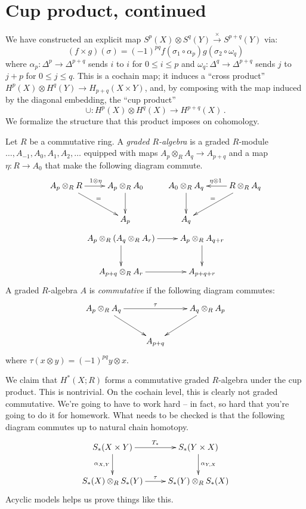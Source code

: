 \section{Cup product, continued}
We have constructed an explicit map $S^p(X)\otimes S^q(Y)\xrightarrow{\times} S^{p+q}(Y)$ via:
\begin{equation*}
(f\times g)(\sigma)=(-1)^{pq}f(\sigma_1\circ\alpha_p)g(\sigma_2\circ\omega_q)
\end{equation*}
where $\alpha_p:\Delta^p\to\Delta^{p+q}$ sends $i$ to $i$ for 
$0\leq i\leq p$ and $\omega_q:\Delta^q\to\Delta^{p+q}$ sends $j$ to $j+p$ 
for  $0\leq j\leq q$. This is a cochain map; it induces a ``cross product''
$ H^p(X)\otimes H^q(Y)\to H_{p+q}(X\times Y)$, and, by composing with the
map induced by the diagonal embedding, the ``cup product''
\[
\cup:H^p(X)\otimes H^q(X)\to H^{p+q}(X)\,.
\]
We formalize the structure that this product imposes on cohomology.
\begin{definition}
Let $R$ be a commutative ring. A \emph{graded $R$-algebra} is a graded $R$-module $\ldots,A_{-1},A_0, A_1,A_2,\ldots$ equipped with maps $A_p\otimes_R A_q\to A_{p+q}$ and a map $\eta:R\to A_0$ that make the following diagram commute.
\[
\xymatrix{
A_p\otimes_R R \ar[r]^{1\otimes\eta} \ar[dr]^= &A_p\otimes_R A_0 \ar[d] &
A_0\otimes_R A_q \ar[d] & R\otimes_R A_q \ar[l]_{\eta\otimes1} \ar[dl]_= \\
& A_p & A_q 
}\]
\begin{equation*}
\xymatrix{
A_p\otimes_R (A_q\otimes_R A_r)\ar[r]\ar[d] & A_p\otimes_R A_{q+r}\ar[d]\\
A_{p+q}\otimes_R A_r \ar[r] & A_{p+q+r}
}
\end{equation*}
A graded $R$-algebra $A$ is {\em commutative} if the following diagram commutes:
\begin{equation*}
\xymatrix{
	A_p\otimes_R A_q\ar[rr]^{\tau}\ar[dr] & & A_q\otimes_R A_p \ar[dl]\\
	 & A_{p+q} & 
}
\end{equation*}
where $\tau(x\otimes y)=(-1)^{pq}y\otimes x$. 
\end{definition}
We claim that $ H^\ast(X;R)$ forms a commutative graded $R$-algebra under the cup product. This is nontrivial. On the cochain level, this is clearly not graded commutative. We're going to have to work hard -- in fact, so hard that you're going to do it for homework. What needs to be checked is that the following 
diagram commutes up to natural chain homotopy.
\begin{equation*}
\xymatrix{S_\ast(X\times Y)\ar[r]^{T_\ast}\ar[d]_{\alpha_{X,Y}} & S_\ast(Y\times X)\ar[d]^{\alpha_{Y,X}}\\
S_\ast(X)\otimes_R S_\ast(Y)\ar[r]^{\tau} & S_\ast(Y)\otimes_R S_\ast(X)}
\end{equation*}
Acyclic models helps us prove things like this.

